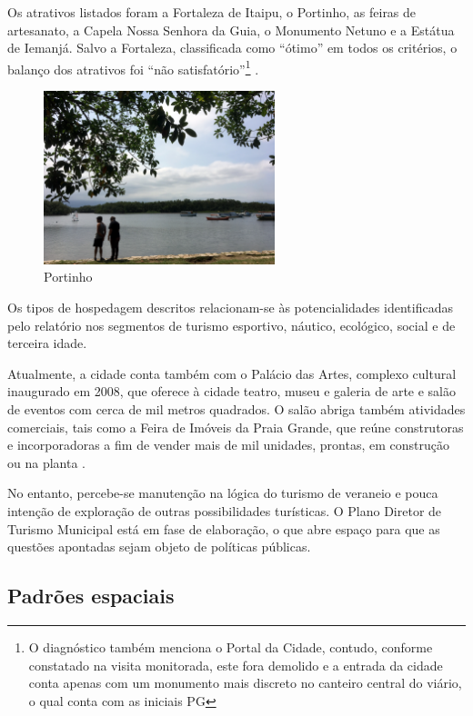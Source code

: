 	Os atrativos listados foram a Fortaleza de Itaipu, o Portinho, as feiras de artesanato, a Capela Nossa Senhora da Guia, o Monumento Netuno e a Estátua de Iemanjá. Salvo a Fortaleza, classificada como ``ótimo'' em todos os critérios, o balanço dos atrativos foi ``não satisfatório''\footnote{O diagnóstico também menciona o Portal da Cidade, contudo, conforme constatado na visita monitorada, este fora demolido e a entrada da cidade conta apenas com um monumento mais discreto no canteiro central do viário, o qual conta com as iniciais PG} \cite[p.66-68]{agem2002a}.
	
	\begin{figure}[!htb]
		\centering
		\caption{Portinho}
		\includegraphics[width=0.6\textwidth]{img/IMG_2004.JPG}
	\end{figure}
	
	Os tipos de hospedagem descritos relacionam-se às potencialidades identificadas pelo relatório nos segmentos de turismo esportivo, náutico, ecológico, social e de terceira idade. 
	
	Atualmente, a cidade conta também com o Palácio das Artes, complexo cultural inaugurado em 2008, que oferece à cidade teatro, museu e galeria de arte e salão de eventos com cerca de mil metros quadrados. O salão abriga também atividades comerciais, tais como a Feira de Imóveis da Praia Grande, que reúne construtoras e incorporadoras a fim de vender mais de mil unidades, prontas, em construção ou na planta \cite{atribuna2017a}.
	
	No entanto, percebe-se manutenção na lógica do turismo de veraneio e pouca intenção de exploração de outras possibilidades turísticas. O Plano Diretor de Turismo Municipal está em fase de elaboração, o que abre espaço para que as questões apontadas sejam objeto de políticas públicas.
	
	\subsection{Padrões espaciais}
	
